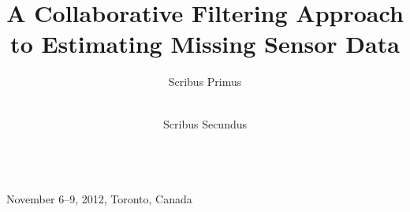 \documentclass[10pt]{sensys11}
\begin{document}
\title{A Collaborative Filtering Approach\\to Estimating Missing Sensor Data}
\author{
{Scribus Primus}\\
\\
 \and
{Scribus Secundus}\\
\\
}

 {November 6--9, 2012, Toronto, Canada}

\maketitle









{\footnotesize


}
\end{document}
